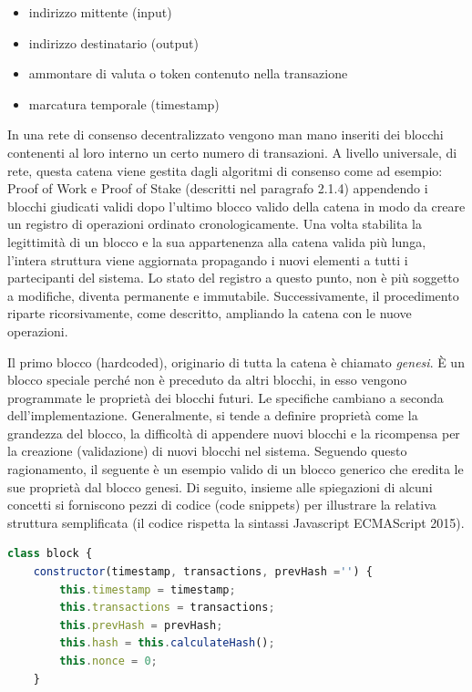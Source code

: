 \begin{itemize}
\item indirizzo mittente (input) 
\item indirizzo destinatario (output)
\item ammontare di valuta o token contenuto nella transazione
\item marcatura temporale (timestamp)
\end{itemize}

In una rete di consenso decentralizzato vengono man mano inseriti dei blocchi contenenti al loro interno un certo numero di transazioni. A livello universale, di rete, questa catena viene gestita dagli algoritmi di consenso come ad esempio: Proof of Work e Proof of Stake (descritti nel paragrafo 2.1.4) appendendo i blocchi giudicati validi dopo l'ultimo blocco valido della catena in modo da creare un registro di operazioni ordinato cronologicamente. Una volta stabilita la legittimità di un blocco e la sua appartenenza alla catena valida più lunga, l’intera struttura viene aggiornata propagando i nuovi elementi a tutti i partecipanti del sistema. Lo stato del registro a questo punto, non è più soggetto a modifiche, diventa permanente e immutabile. Successivamente, il procedimento riparte ricorsivamente, come descritto, ampliando la catena con le nuove operazioni.

Il primo blocco \smallskip {} (hardcoded), originario di tutta la catena è chiamato \emph{genesi}. È un blocco speciale perché non è preceduto da altri blocchi, in esso vengono programmate le proprietà dei blocchi futuri. Le specifiche cambiano a seconda dell’implementazione. Generalmente, si tende a definire proprietà come la grandezza del blocco, la difficoltà di appendere nuovi blocchi e la ricompensa per la creazione (validazione) di nuovi blocchi nel sistema. 
Seguendo questo ragionamento, il seguente è un esempio valido di un blocco generico che eredita le sue proprietà dal blocco genesi.
Di seguito, insieme alle spiegazioni di alcuni concetti si forniscono pezzi di codice (code snippets) per illustrare la relativa struttura semplificata (il codice rispetta la sintassi Javascript ECMAScript 2015). 
\\

\begin{lstlisting}[caption={Esempio di struttura di un blocco},language=JavaScript]
class block {
    constructor(timestamp, transactions, prevHash ='') {
        this.timestamp = timestamp;
        this.transactions = transactions;
        this.prevHash = prevHash;
        this.hash = this.calculateHash();
        this.nonce = 0;
    }
\end{lstlisting}

